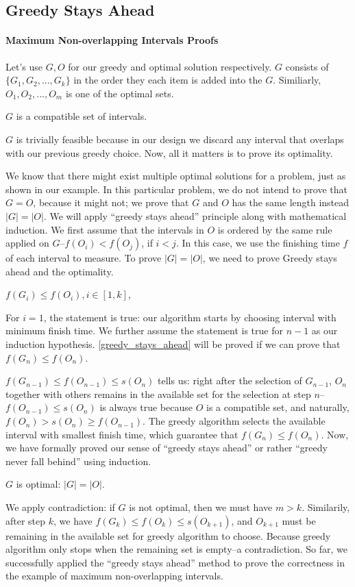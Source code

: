 \documentclass[../main.tex]{subfiles}
\begin{document}
\subsection{Greedy Stays Ahead}
\paragraph{Maximum Non-overlapping Intervals Proofs} Let's use $G, O$ for our greedy and optimal solution respectively. $G$ consists of $\{G_1, G_2, ..., G_k\}$ in the order they each item is added into the $G$. Similiarly, $O_1, O_2, ..., O_m$ is  one of the optimal sets. 
\begin{theorem}
$G$ is a compatible set of intervals.
\end{theorem}
$G$ is trivially feasible because in our design we discard any interval that overlaps with our previous greedy choice. Now, all it matters is to prove its optimality. 

We know that there might exist multiple optimal solutions for a problem, just as shown in our example. In this particular problem, we do not intend to prove that $G=O$, because it might not; we prove that $G$ and $O$ has the same length instead $|G|=|O|$. We will apply ``greedy stays ahead'' principle along with mathematical induction. We first assume that the intervals in $O$ is ordered by the same rule applied on $G$--$f(O_i)<f(O_j)$, if $i<j$. In this case, we use the finishing time $f$ of each interval to measure. To prove $|G|=|O|$, we need to prove Greedy stays ahead and the optimality.
\begin{theorem}\label{greedy_stays_ahead}
$f(G_i)\leq f(O_i), i \in [1, k]$, 
\end{theorem}
For $i=1$, the statement is true: our algorithm starts by choosing interval with minimum finish time. We further assume the statement is true for $n-1$ as our induction hypothesis. \ref{greedy_stays_ahead} will be proved if we can prove that $f(G_n) \leq f(O_n)$. 

$f(G_{n-1})\leq f(O_{n-1}) \leq s(O_n)$ tells us: right after the selection of $G_{n-1}$, $O_n$ together with others remains in the available set for the selection at step $n$--$f(O_{n-1}) \leq s(O_n)$ is always true because $O$ is a compatible set, and naturally, $f(O_n)>s(O_n)\geq f(O_{n-1})$. The greedy algorithm selects the available interval with smallest finish time, which guarantee that $f(G_n)\leq f(O_n)$. Now, we have formally proved our sense of ``greedy stays ahead'' or rather ``greedy never fall behind'' using induction. 
\begin{theorem}\label{prove_optimality}
$G$ is optimal: $|G|=|O|$. 
\end{theorem}
We apply contradiction: if $G$ is not optimal, then we must have $m>k$. Similarily, after step $k$, we have $f(G_{k})\leq f(O_{k}) \leq s(O_{k+1})$, and $O_{k+1}$ must be remaining in the available set for greedy algorithm to choose. Because greedy algorithm only stops when the remaining set is empty--a contradiction. So far, we successfully applied the ``greedy stays ahead'' method to prove the correctness in the example of maximum non-overlapping intervals. 
\end{document}
